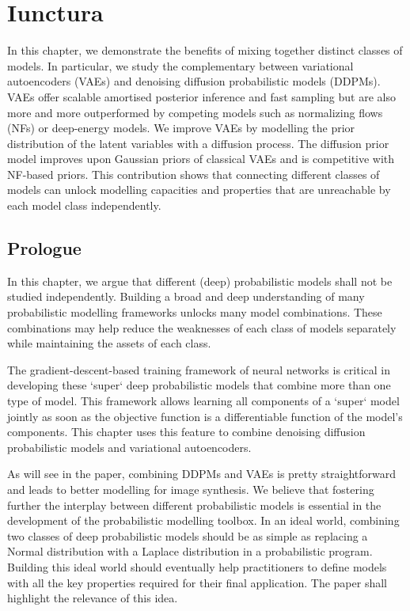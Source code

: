 \chapter{Iunctura}\label{ch:03}

\begin{chapter_outline}

  In this chapter, we demonstrate the benefits of mixing together distinct classes of models. In particular, we study the complementary between variational autoencoders (VAEs) and denoising diffusion probabilistic models (DDPMs). VAEs offer scalable amortised posterior inference and fast sampling but are also more and more outperformed by competing models such as normalizing flows (NFs) or deep-energy models. We improve VAEs by modelling the prior distribution of the latent variables with a diffusion process. The diffusion prior model improves upon Gaussian priors of classical VAEs and is competitive with NF-based priors.
  This contribution shows that connecting different classes of models can unlock modelling capacities and properties that are unreachable by each model class independently.
\end{chapter_outline}
\section{Prologue}
In this chapter, we argue that different (deep) probabilistic models shall not be studied independently. Building a broad and deep understanding of many probabilistic modelling frameworks unlocks many model combinations. These combinations may help reduce the weaknesses of each class of models separately while maintaining the assets of each class.

The gradient-descent-based training framework of neural networks is critical in developing these `super` deep probabilistic models that combine more than one type of model. This framework allows learning all components of a `super` model jointly as soon as the objective function is a differentiable function of the model's components. This chapter uses this feature to combine denoising diffusion probabilistic models and variational autoencoders.

As will see in the paper, combining DDPMs and VAEs is pretty straightforward and leads to better modelling for image synthesis. We believe that fostering further the interplay between different probabilistic models is essential in the development of the probabilistic modelling toolbox. In an ideal world, combining two classes of deep probabilistic models should be as simple as replacing a Normal distribution with a Laplace distribution in a probabilistic program. Building this ideal world should eventually help practitioners to define models with all the key properties required for their final application. The paper shall highlight the relevance of this idea.

